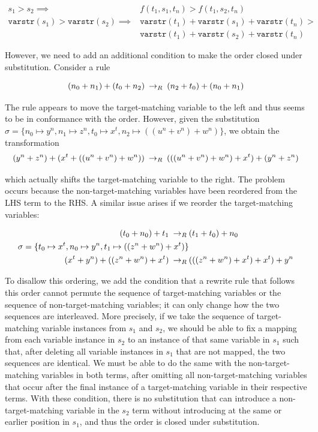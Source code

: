 \begin{align*}
s_1 > s_2 \implies & f(t_1,s_1,t_n) > f(t_1,s_2,t_n) \\
\texttt{varstr}(s_1) > \texttt{varstr}(s_2) \implies & \texttt{varstr}(t_1) + \texttt{varstr}(s_1) + \texttt{varstr}(t_n) > \\
&\texttt{varstr}(t_1) + \texttt{varstr}(s_2) + \texttt{varstr}(t_n)
\end{align*}

However, we need to add an additional condition to make the order closed under substitution. Consider a rule

\[ (n_0 + n_1) + (t_0 + n_2) \:\rightarrow_{R}\: (n_2 + t_0) + (n_0 + n_1)
\]

The rule appears to move the target-matching variable to the left and thus seems to be in conformance with the order. However, given the substitution $\sigma = \{ n_0 \mapsto y^n, n_1 \mapsto z^n, t_0 \mapsto x^t, n_2 \mapsto ((u^n + v^n) + w^n)\}$, we obtain the transformation
\[ (y^n + z^n) + (x^t + ((u^n + v^n) + w^n)) \:\rightarrow_{R}\: (((u^n + v^n) + w^n) + x^t) + (y^n + z^n)
\]

which actually shifts the target-matching variable to the right. The problem occurs because the non-target-matching variables have been reordered from the LHS term to the RHS. A similar issue arises if we reorder the target-matching variables:

\begin{align*}
(t_0 + n_0) + t_1 \:\rightarrow_{R}\: & (t_1 + t_0) + n_0 \\
\sigma = \{ t_0 \mapsto x^t, n_0 \mapsto y^n, t_1 \mapsto ((z^n + w^n) + x^t)\} \\
(x^t + y^n) + ((z^n + w^n) + x^t) \:\rightarrow_{R}\: & (((z^n + w^n) + x^t) + x^t) + y^n
\end{align*}

To disallow this ordering, we add the condition that a rewrite rule that follows this order cannot permute the sequence of target-matching variables or the sequence of non-target-matching variables; it can only change how the two sequences are interleaved. More precisely, if we take the sequence of target-matching variable instances from $s_1$ and $s_2$, we should be able to fix a mapping from each variable instance in $s_2$ to an instance of that same variable in $s_1$ such that, after deleting all variable instances in $s_1$ that are not mapped, the two sequences are identical. We must be able to do the same with the non-target-matching variables in both terms, after omitting all non-target-matching variables that occur after the final instance of a target-matching variable in their respective terms. With these condition, there is no substitution that can introduce a non-target-matching variable in the $s_2$ term without introducing at the same or earlier position in $s_1$, and thus the order is closed under substitution.

